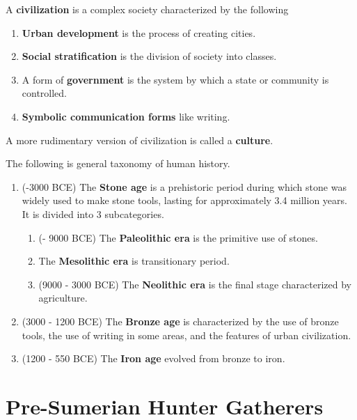 \documentclass{article}
\begin{document}
  \begin{definition}[Civilization]
    A \textbf{civilization} is a complex society characterized by the following 
    \begin{enumerate}
      \item \textbf{Urban development} is the process of creating cities. 
      \item \textbf{Social stratification} is the division of society into classes. 
      \item A form of \textbf{government} is the system by which a state or community is controlled. 
      \item \textbf{Symbolic communication forms} like writing.
    \end{enumerate}
  \end{definition}

  A more rudimentary version of civilization is called a \textbf{culture}. 

  \begin{definition}
    The following is general taxonomy of human history. 
    \begin{enumerate} 
      \item (-3000 BCE) The \textbf{Stone age} is a prehistoric period during which stone was widely used to make stone tools, lasting for approximately 3.4 million years. It is divided into 3 subcategories. 
        \begin{enumerate}
          \item (- 9000 BCE) The \textbf{Paleolithic era} is the primitive use of stones. 
          \item The \textbf{Mesolithic era} is transitionary period. 
          \item (9000 - 3000 BCE) The \textbf{Neolithic era} is the final stage characterized by agriculture. 
        \end{enumerate}
      \item (3000 - 1200 BCE) The \textbf{Bronze age} is characterized by the use of bronze tools, the use of writing in some areas, and the features of urban civilization. 
      \item (1200 - 550 BCE) The \textbf{Iron age} evolved from bronze to iron. 
    \end{enumerate}
  \end{definition}

\section{Pre-Sumerian Hunter Gatherers}
\end{document}
